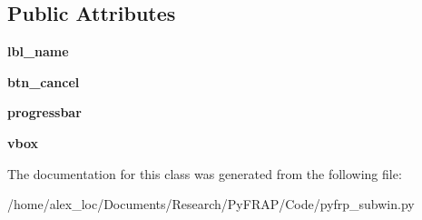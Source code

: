 \subsection*{Public Attributes}
\begin{DoxyCompactItemize}
\item 
\hypertarget{classpyfrp__subwin_1_1simulation__prog_a48efd7edeedbb14a5d428429af1c718f}{{\bfseries lbl\+\_\+name}}\label{classpyfrp__subwin_1_1simulation__prog_a48efd7edeedbb14a5d428429af1c718f}

\item 
\hypertarget{classpyfrp__subwin_1_1simulation__prog_a8dbd40225b6f21db3ce5335cf43113b3}{{\bfseries btn\+\_\+cancel}}\label{classpyfrp__subwin_1_1simulation__prog_a8dbd40225b6f21db3ce5335cf43113b3}

\item 
\hypertarget{classpyfrp__subwin_1_1simulation__prog_ad949a9cfe62bd24a7a1122df312aa8a1}{{\bfseries progressbar}}\label{classpyfrp__subwin_1_1simulation__prog_ad949a9cfe62bd24a7a1122df312aa8a1}

\item 
\hypertarget{classpyfrp__subwin_1_1simulation__prog_a6261d29ef6bd6511c9c7da0d8c3de6a7}{{\bfseries vbox}}\label{classpyfrp__subwin_1_1simulation__prog_a6261d29ef6bd6511c9c7da0d8c3de6a7}

\end{DoxyCompactItemize}


The documentation for this class was generated from the following file\+:\begin{DoxyCompactItemize}
\item 
/home/alex\+\_\+loc/\+Documents/\+Research/\+Py\+F\+R\+A\+P/\+Code/pyfrp\+\_\+subwin.\+py\end{DoxyCompactItemize}
